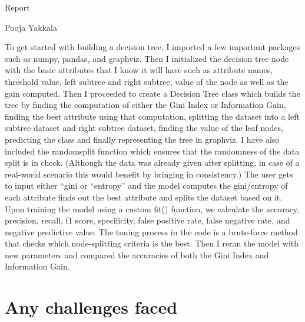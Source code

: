 \documentclass[a4paper]{article}
\begin{document}
\begin{titlepage}
\begin{center} 

        \Huge{Report} \vspace{1cm} 
        
        \large{Pooja Yakkala} \vspace{0.3cm}
        
        
    \end{center} 
\end{titlepage} 

To get started with building a decision tree, I imported a few important packages such as numpy, pandas, and graphviz. Then I initialized the decision tree node with the basic attributes that I know it will have such as attribute names, threshold value, left subtree and right subtree, value of the node as well as the gain computed. Then I proceeded to create a Decision Tree class which builds the tree by finding the computation of either the Gini Index or Information Gain, finding the best attribute using that computation, splitting the dataset into a left subtree dataset and right subtree dataset, finding the value of the leaf nodes, predicting the class and finally representing the tree in graphviz. I have also included the randomsplit function which ensures that the randomness of the data split is in check. (Although the data was already given after splitting, in case of a real-world scenario this would benefit by bringing in consistency.) The user gets to input either “gini or “entropy” and the model computes the gini/entropy of each attribute finds out the best attribute and splits the dataset based on it. Upon training the model using a custom fit() function, we calculate the accuracy, precision, recall, f1 score, specificity, false positive rate, false negative rate, and negative predictive value. The tuning process in the code is a brute-force method that checks which node-splitting criteria is the best. Then I reran the model with new parameters and compared the accuracies of both the Gini Index and Information Gain.

\section*{Any challenges faced}
\end{document}

